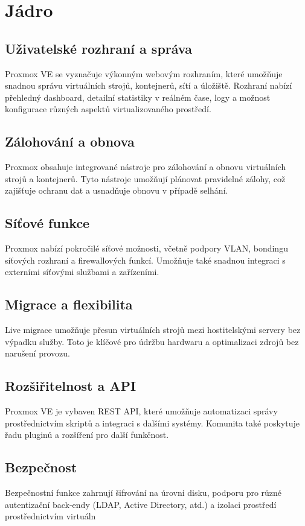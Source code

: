 \chapter{Jádro}

\section{Uživatelské rozhraní a správa}
Proxmox VE se vyznačuje výkonným webovým rozhraním, které umožňuje snadnou správu virtuálních strojů, kontejnerů, sítí a úložiště. Rozhraní nabízí přehledný dashboard, detailní statistiky v reálném čase, logy a možnost konfigurace různých aspektů virtualizovaného prostředí.


\section{Zálohování a obnova}
Proxmox obsahuje integrované nástroje pro zálohování a obnovu virtuálních strojů a kontejnerů. Tyto nástroje umožňují plánovat pravidelné zálohy, což zajišťuje ochranu dat a usnadňuje obnovu v případě selhání.

\section{Síťové funkce}
Proxmox nabízí pokročilé síťové možnosti, včetně podpory VLAN, bondingu síťových rozhraní a firewallových funkcí. Umožňuje také snadnou integraci s externími síťovými službami a zařízeními.

\section{Migrace a flexibilita}
Live migrace umožňuje přesun virtuálních strojů mezi hostitelskými servery bez výpadku služby. Toto je klíčové pro údržbu hardwaru a optimalizaci zdrojů bez narušení provozu.

\section{Rozšiřitelnost a API}
Proxmox VE je vybaven REST API, které umožňuje automatizaci správy prostřednictvím skriptů a integraci s dalšími systémy. Komunita také poskytuje řadu pluginů a rozšíření pro další funkčnost.

\section{Bezpečnost}
Bezpečnostní funkce zahrnují šifrování na úrovni disku, podporu pro různé autentizační back-endy (LDAP, Active Directory, atd.) a izolaci prostředí prostřednictvím virtuáln